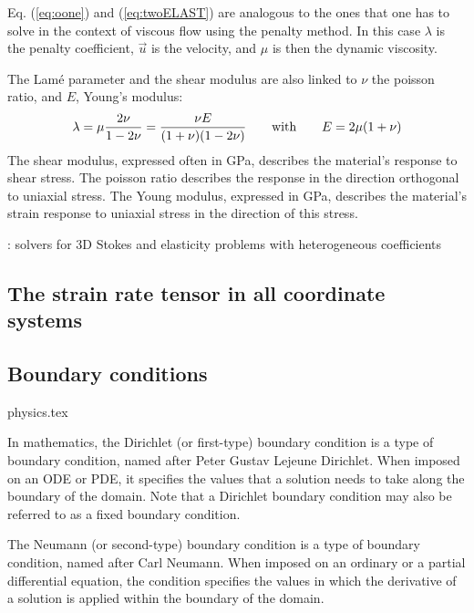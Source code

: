 

\begin{remark}
Eq. (\ref{eq:oone}) and (\ref{eq:twoELAST}) are analogous to the ones that one has to solve
in the context of viscous flow using the penalty method. In this case $\lambda$ is the penalty coefficient, 
$\vec{u}$ is the velocity, and $\mu$ is then the dynamic viscosity.
\end{remark}

The Lam\'e parameter and the shear modulus are also linked to $\nu$ the poisson ratio, 
and $E$, Young's modulus:  
\[
\lambda=\mu\frac{2\nu}{1-2\nu}
=\frac{\nu E}{(1+\nu)(1-2\nu)}
\quad\quad
{\rm with}
\quad\quad
E=2\mu(1+\nu)
\]
The shear modulus, expressed often in GPa, describes the material's response to shear stress.
The poisson ratio describes the response in the direction orthogonal to uniaxial stress.
The Young modulus, expressed in GPa, describes the material's strain response to uniaxial stress in the 
direction of this stress.


\Literature: solvers for 3D Stokes and elasticity problems with
heterogeneous coefficients \cite{samb20}




\newpage
\subsection{The strain rate tensor in all coordinate systems}



\newpage
\subsection{Boundary conditions}
\begin{flushright} {\tiny {\color{gray} physics.tex}} \end{flushright}

In mathematics, the Dirichlet (or first-type) 
boundary condition is a type of boundary condition, named after Peter Gustav Lejeune Dirichlet.
When imposed on an ODE or PDE, it specifies the values that a solution needs 
to take along the boundary of the domain.
Note that a Dirichlet boundary condition may also be referred to as a fixed boundary condition. 

The Neumann (or second-type) boundary condition is a type of boundary condition, 
named after Carl Neumann. When imposed on an ordinary or a partial differential equation, 
the condition specifies the values in which the derivative of a solution is 
applied within the boundary of the domain.

